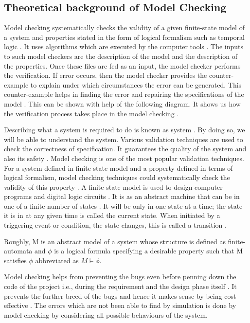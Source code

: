 \documentclass[a4paper,12pt]{report}
\begin{document}
\begin{onehalfspacing}
\chapter{ Theoretical background of Model Checking}
\label{Background of Model check}

Model checking systematically checks the validity of a given finite-state model of a system and properties stated in the form of logical formalism such as temporal logic \cite{Palshikar2004}. It uses algorithms which are executed by the computer tools \cite{McMillan2003}. The inputs to such model checkers are the description of the model and the description of the properties. Once these files are fed as an input, the model checker performs the verification. If error occurs, then the model checker provides the counter-example to explain under which circumstances the error can be generated. This counter-example helps in finding the error and repairing the specifications of the model \cite{Wang2007}. This can be shown with help of the following diagram. It shows us how the verification process takes place in the model checking \cite{DanielJackson2004}.  

Describing what a system is required to do is known as system \cite{Wang2007}. By doing so, we will be able to understand the system. Various validation techniques are used to check the correctness of specification. It guarantees the quality of the system and also its safety \cite{Clarke1999}. Model checking is one of the most popular validation techniques. For a system defined in finite state model and a property defined in terms of logical formalism, model checking techniques could systematically check the validity of this property \cite{DawsonEngler}. A finite-state model is used to design computer programs and digital logic circuits \cite{ErichGamma1995}. It is as an abstract machine that can be in one of a finite number of states \cite{M.Davis1962}. It will be only in one state at a time; the state it is in at any given time is called the current state. When initiated by a triggering event or condition, the state changes, this is called a transition \cite{J.M.Wing1996}.

Roughly, M is an abstract model of a system whose structure is defined as finite-automata and $\phi$  is a logical formula specifying a desirable property such that M satisfies $\phi$  abbreviated as $M \models \phi$. 

Model checking helps from preventing the bugs even before penning down the code of the project i.e., during the requirement and the design phase itself \cite{ErichGamma1995}. It prevents the further breed of the bugs and hence it makes sense by being cost effective \cite{Havelund2001}. The errors which are not been able to find by simulation is done by model checking by considering all possible behaviours of the system\cite{Havelund2001}. 


\end{onehalfspacing}
\end{document}
